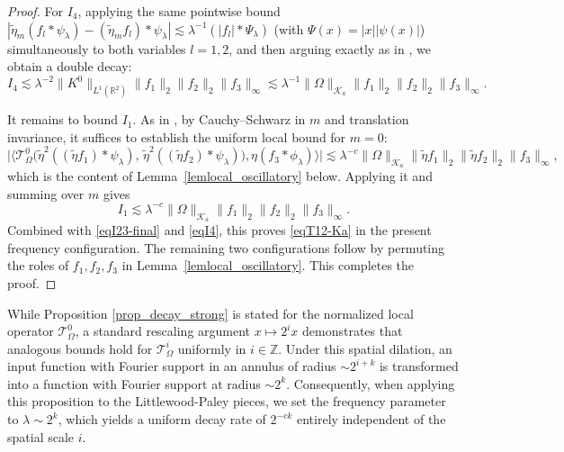 \documentclass[11pt]{amsart}
\begin{document}
\begin{proof}
	For $I_4$, applying the same pointwise bound
	$|\widetilde\eta_m(f_l*\psi_\lambda)-(\widetilde\eta_m f_l)*\psi_\lambda|
	\lesssim\lambda^{-1}(|f_l|*\Psi_\lambda)$ (with $\Psi(x)=|x||\psi(x)|$)
	simultaneously to both variables $l=1,2$, and then arguing exactly as
	in \cite[Section~4.1]{bhojak2025alternate}, we obtain a double decay:
	\begin{equation}\label{eqI4}
		I_4
		\lesssim
		\lambda^{-2}\|K^0\|_{L^1(\mathbb R^2)}\|f_1\|_2\|f_2\|_2\|f_3\|_\infty
		\lesssim
		\lambda^{-1}\|\Omega\|_{\mathcal K_a}\|f_1\|_2\|f_2\|_2\|f_3\|_\infty.
	\end{equation}

	It remains to bound $I_1$. As in \cite[Section~4.1]{bhojak2025alternate},
	by Cauchy--Schwarz in $m$ and translation invariance, it suffices to
	establish the uniform local bound for $m=0$:
	\begin{equation}\label{eqlocal-goal}
		\Big|\Big\langle \mathcal{T}_\Omega^0\bigl(
		\widetilde\eta^2((\widetilde\eta f_1)*\psi_\lambda),\,
		\widetilde\eta^2((\widetilde\eta f_2)*\psi_\lambda)\bigr),
		\eta(f_3*\phi_\lambda)\Big\rangle\Big|
		\lesssim
		\lambda^{-c}\|\Omega\|_{\mathcal K_a}
		\|\widetilde\eta f_1\|_2\|\widetilde\eta f_2\|_2\|f_3\|_\infty,
	\end{equation}
	which is the content of Lemma~\ref{lemlocal_oscillatory} below.
	Applying it and summing over $m$ gives
	\[
	I_1\lesssim\lambda^{-c}\|\Omega\|_{\mathcal K_a}
	\|f_1\|_2\|f_2\|_2\|f_3\|_\infty.
	\]
	Combined with \eqref{eqI23-final} and \eqref{eqI4}, this proves
	\eqref{eqT12-Ka} in the present frequency configuration. The remaining
	two configurations follow by permuting the roles of $f_1,f_2,f_3$ in
	Lemma~\ref{lemlocal_oscillatory}. This completes the proof.
\end{proof}

\begin{remark}\label{rem_scale_inv}
	While Proposition \ref{prop_decay_strong} is stated for the normalized local operator $\mathcal {T}_\Omega^0$, a standard rescaling argument $x \mapsto 2^i x$ demonstrates that analogous bounds hold for $\mathcal {T}_\Omega^i$ uniformly in $i \in \mathbb{Z}$. Under this spatial dilation, an input function with Fourier support in an annulus of radius $\sim 2^{i+k}$ is transformed into a function with Fourier support at radius $\sim 2^k$. Consequently, when applying this proposition to the Littlewood-Paley pieces, we set the frequency parameter to $\lambda \sim 2^k$, which yields a uniform decay rate of $2^{-ck}$ entirely independent of the spatial scale $i$.
\end{remark}
\end{document}
